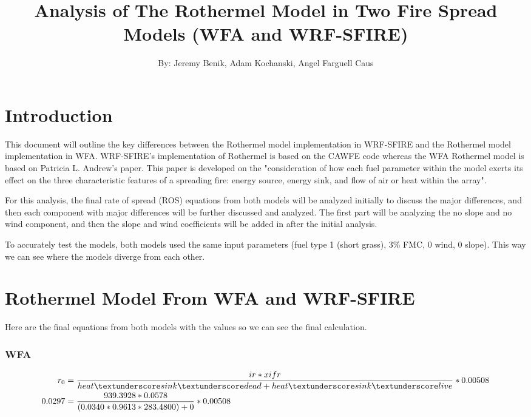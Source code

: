 \documentclass{article}
\newcommand\und{\textunderscore}
\begin{document}
\title{Analysis of The Rothermel Model in Two Fire Spread Models (WFA and WRF-SFIRE)}
\author{By: Jeremy Benik, Adam Kochanski, Angel Farguell Caus}
\maketitle

\section{Introduction}
	This document will outline the key differences between the Rothermel model implementation in WRF-SFIRE and the Rothermel model implementation in WFA. WRF-SFIRE's implementation of Rothermel is based on the CAWFE code whereas the WFA Rothermel model is based on Patricia L. Andrew's paper. This paper is developed on the "consideration of how each fuel parameter within the model exerts its effect on the three characteristic features of a spreading fire: energy source, energy sink, and flow of air or heat within the array"\citep{Andrews2018}. 
	
	For this analysis, the final rate of spread (ROS) equations from both models will be analyzed initially to discuss the major differences, and then each component with major differences will be further discussed and analyzed. The first part will be analyzing the no slope and no wind component, and then the slope and wind coefficients will be added in after the initial analysis. 
	
	To accurately test the models, both models used the same input parameters (fuel type 1 (short grass), 3\% FMC, 0 wind, 0 slope). This way we can see where the models diverge from each other. 
	
\section{Rothermel Model From WFA and WRF-SFIRE}

Here are the final equations from both models with the values so we can see the final calculation. 

\subsubsection*{WFA}
	\begin{equation}
	\label{r0_WFA_2}
	\begin{split}
	r_0 &= \frac{ir * xifr}{heat\und sink\und dead + heat\und sink\und live} * 0.00508 \\
	0.0297 &= \frac{939.3928 * 0.0578}{(0.0340 * 0.9613 * 283.4800) + 0} * 0.00508
	\end{split}
\end{equation}
\end{document}
